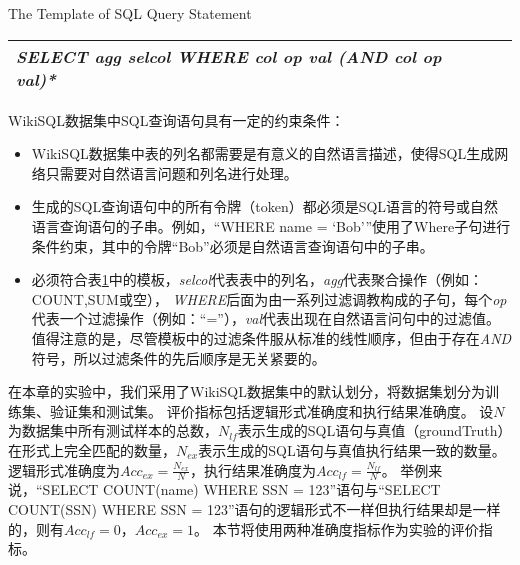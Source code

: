\begin{table}[!hpb]
  \centering
    {The Template of SQL Query Statement}
  \label{nli:sqlmb}
  \begin{tabular}{@{}llr@{}} \toprule
  \emph{SELECT   agg   selcol   WHERE   col   op   val   (AND   col   op   val)*}\\\bottomrule

  \end{tabular}
\end{table}

WikiSQL数据集中SQL查询语句具有一定的约束条件：

\begin{itemize}
  \item WikiSQL数据集中表的列名都需要是有意义的自然语言描述，使得SQL生成网络只需要对自然语言问题和列名进行处理。
  \item 生成的SQL查询语句中的所有令牌（token）都必须是SQL语言的符号或自然语言查询语句的子串。例如，“WHERE name = ‘Bob’”使用了Where子句进行条件约束，其中的令牌“Bob”必须是自然语言查询语句中的子串。
  \item 必须符合表\ref{nli:sqlmb}中的模板，\emph{selcol}代表表中的列名，\emph{agg}代表聚合操作（例如：COUNT,SUM或空），
      \emph{WHERE}后面为由一系列过滤调教构成的子句，每个\emph{op}代表一个过滤操作（例如：“=”），\emph{val}代表出现在自然语言问句中的过滤值。
      值得注意的是，尽管模板中的过滤条件服从标准的线性顺序，但由于存在\emph{AND}符号，所以过滤条件的先后顺序是无关紧要的。
\end{itemize}

在本章的实验中，我们采用了WikiSQL数据集中的默认划分，将数据集划分为训练集、验证集和测试集。
评价指标包括逻辑形式准确度和执行结果准确度。
设$N$为数据集中所有测试样本的总数，$N_{lf}$表示生成的SQL语句与真值（groundTruth）在形式上完全匹配的数量，$N_{ex}$表示生成的SQL语句与真值执行结果一致的数量。
逻辑形式准确度为$Acc_{ex} = \frac{N_{ex}}{N}$，执行结果准确度为$Acc_{lf} = \frac{N_{lf}}{N}$。
举例来说，“SELECT COUNT(name) WHERE SSN = 123”语句与“SELECT COUNT(SSN) WHERE SSN = 123”语句的逻辑形式不一样但执行结果却是一样的，则有$Acc_{lf} = 0$，$Acc_{ex} = 1$。
本节将使用两种准确度指标作为实验的评价指标。

